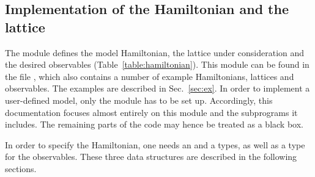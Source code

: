 
\subsection{Implementation of the Hamiltonian and the lattice} 
\label{sec:hamiltonian}

The module  defines the model Hamiltonian, the lattice under consideration and the desired observables (Table~\ref{table:hamiltonian}). This module can be found in the file , which also contains a number of example Hamiltonians, lattices and observables.  The examples are described in Sec.~\ref{sec:ex}.
In order to implement a user-defined model, only the module  has to be set up. Accordingly, this documentation focuses almost entirely  on this module and the subprograms it includes.
The remaining parts of the code may hence be treated as a black box.  

In order to specify the Hamiltonian, one needs  an   and a  types, as well as a type for the observables. These three data structures are described in the following sections.

